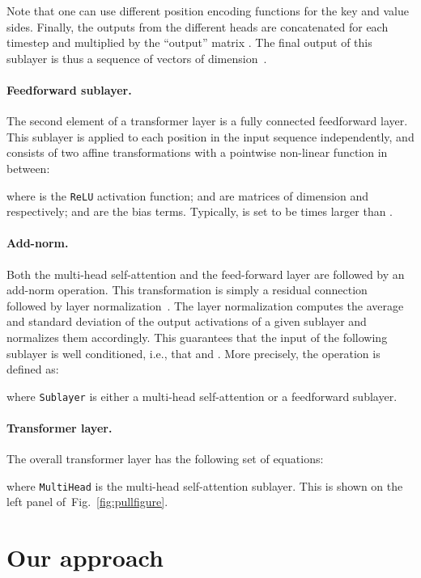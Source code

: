 \documentclass{article}
\begin{document}
Note that one can use different position encoding functions for the key and value sides.
Finally, the outputs from the different heads are concatenated for each timestep  and multiplied by the  ``output'' matrix .
The final output of this sublayer is thus a sequence of  vectors of dimension~.

\paragraph{Feedforward sublayer.}
The second element of a transformer layer is a fully connected feedforward layer.
This sublayer is applied to each position  in the input sequence independently, and consists of two affine transformations with a pointwise non-linear function in between:

where  is the \texttt{ReLU} activation function;  and  are matrices of dimension  and  respectively;  and  are the bias terms.
Typically,  is set to be  times larger than .

\paragraph{Add-norm.}
Both the multi-head self-attention and the feed-forward layer are followed by an add-norm operation.
This transformation is simply a residual connection~\cite{he2016deep} followed by layer normalization~\cite{ba2016layer}.
The layer normalization computes the average and standard deviation of the output activations of a given sublayer and normalizes them accordingly.
This guarantees that the input  of the following sublayer is well conditioned, i.e., that  and .
More precisely, the  operation is defined as:

where \texttt{Sublayer} is either a multi-head self-attention or a feedforward sublayer.

\paragraph{Transformer layer.}
The overall transformer layer has the following set of equations:

where \texttt{MultiHead} is the multi-head self-attention sublayer.
This is shown on the left panel of~Fig.~\ref{fig:pullfigure}.

\section{Our approach}
\label{sec:approach}
\end{document}
